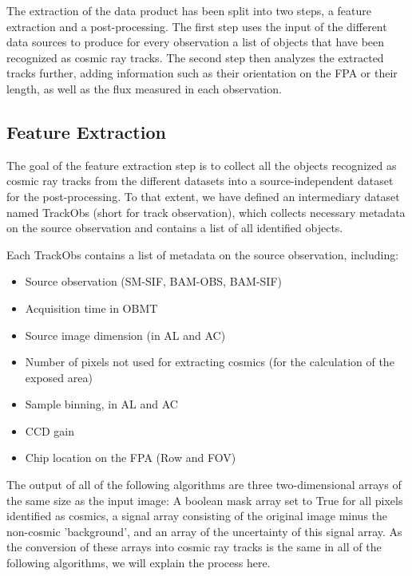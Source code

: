 \documentclass[a4paper, 11pt]{article}
\begin{document}
The extraction of the data product has been split into two steps, a feature extraction and a post-processing. The first step uses the input of the different data sources to produce for every observation a list of objects that have been recognized as cosmic ray tracks. The second step then analyzes the extracted tracks further, adding information such as their orientation on the FPA or their length, as well as the flux measured in each observation.

\subsection{Feature Extraction}
\label{sec:extraction}

The goal of the feature extraction step is to collect all the objects recognized as cosmic ray tracks from the different datasets into a source-independent dataset for the post-processing. To that extent, we have defined an intermediary dataset named TrackObs (short for track observation), which collects necessary metadata on the source observation and contains a list of all identified objects.

Each TrackObs contains a list of metadata on the source observation, including:
\begin{itemize}
  \item Source observation (SM-SIF, BAM-OBS, BAM-SIF)
  \item Acquisition time in OBMT
  \item Source image dimension (in AL and AC)
  \item Number of pixels not used for extracting cosmics (for the calculation of the exposed area)
  \item Sample binning, in AL and AC
  \item CCD gain
  \item Chip location on the FPA (Row and FOV)
\end{itemize}

The output of all of the following algorithms are three two-dimensional arrays of the same size as the input image: A boolean mask array set to True for all pixels identified as cosmics, a signal array consisting of the original image minus the non-cosmic 'background', and an array of the uncertainty of this signal array. As the conversion of these arrays into cosmic ray tracks is the same in all of the following algorithms, we will explain the process here. 
\end{document}
